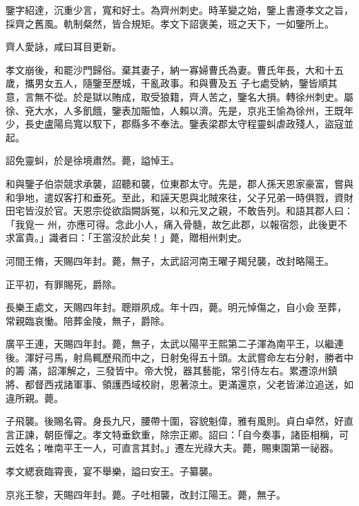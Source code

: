 \begin{pinyinscope}
 鑒字紹達，沉重少言，寬和好士。為齊州刺史。時革變之始，鑒上書遵孝文之旨，採齊之舊風。軌制粲然，皆合規矩。孝文下詔褒美，班之天下，一如鑒所上。



 齊人愛詠，咸曰耳目更新。



 孝文崩後，和罷沙門歸俗。棄其妻子，納一寡婦曹氏為妻。曹氏年長，大和十五歲，攜男女五人，隨鑒至歷城，干亂政事。和與曹及五
 子七處受納，鑒皆順其意，言無不從。於是獄以賄成，取受狼籍，齊人苦之，鑒名大損。轉徐州刺史。屬徐、兗大水，人多飢餓，鑒表加賑恤，人賴以濟。先是，京兆王愉為徐州，王既年少，長史盧陽烏寬以馭下，郡縣多不奉法。鑒表梁郡太守程靈虯虐政殘人，盜寇並起。



 詔免靈虯，於是徐境肅然。薨，謚悼王。



 和與鑒子伯崇競求承襲，詔聽和襲，位東郡太守。先是，郡人孫天恩家豪富，嘗與和爭地，遣奴客打和垂死。至此，和誣天恩與北賊來往，父子兄弟一時俱戮，資財田宅皆沒於官。天恩宗從欲詣闕訴冤，以和元叉之親，不敢告列。和語其郡人曰：「我覓一
 州，亦應可得。念此小人，痛入骨髓，故乞此郡，以報宿怨，此後更不求富貴。」識者曰：「王當沒於此矣！」薨，贈相州刺史。



 河間王脩，天賜四年封。薨，無子，太武詔河南王曜子羯兒襲，改封略陽王。



 正平初，有罪賜死，爵除。



 長樂王處文，天賜四年封。聰辯夙成。年十四，薨。明元悼傷之，自小僉至葬，常親臨哀慟。陪葬金陵，無子，爵除。



 廣平王連，天賜四年封。薨，無子，太武以陽平王熙第二子渾為南平王，以繼連後。渾好弓馬，射鳥輒歷飛而中之，日射兔得五十頭。太武嘗命左右分射，勝者中的籌
 滿，詔渾解之，三發皆中。帝大悅，器其藝能，常引侍左右。累遷涼州鎮將、都督西戎諸軍事、領護西域校尉，恩著涼土。更滿還京，父老皆涕泣追送，如違所親。薨。



 子飛襲。後賜名霄。身長九尺，腰帶十圍，容貌魁偉，雅有風則。貞白卓然，好直言正諫，朝臣憚之。孝文特垂欽重，除宗正卿。詔曰：「自今奏事，諸臣相稱，可云姓名；唯南平王一人，可直言其封。」遷左光祿大夫。薨，賜東園第一祕器。



 孝文緦衰臨霄喪，宴不舉樂，謚曰安王。子纂襲。



 京兆王黎，天賜四年封。薨。子吐相襲，改封江陽王。薨，無子。




\end{pinyinscope}

